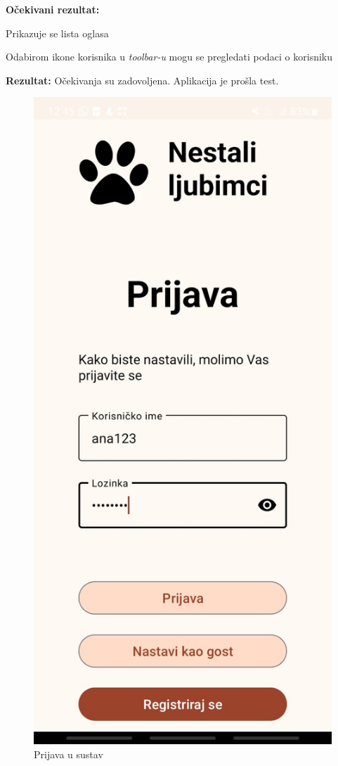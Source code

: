 			\noindent \textbf{Očekivani rezultat: }
			\begin{packed_enum}
				\item Prikazuje se lista oglasa
				\item Odabirom ikone korisnika u \textit{toolbar-u} mogu se pregledati podaci o korisniku			
			\end{packed_enum}

			\noindent \textbf{Rezultat:} Očekivanja su zadovoljena. Aplikacija je prošla test.

			\begin{figure}[H]
			\centering
			\begin{minipage}{.5\textwidth}
	 			 \centering
				  \includegraphics[width=.58\linewidth]{slike/app1v1.jpg}
				  \caption{Prijava u sustav}
				  \label{fig:app1v1}
			\end{minipage}%
			\begin{minipage}{.5\textwidth}
				  \centering

\end{minipage}
\end{figure}
